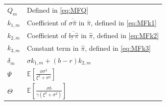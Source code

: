 \documentclass[11pt]{article}
\newenvironment{bluepar}
{\begingroup\color{blue}}
{\endgroup}
\numberwithin{equation}{section}
\begin{document}
\begin{bluepar}
\begin{table}[htbp]
\begin{tabular}{l l}
		$Q_{\scriptscriptstyle m}$ & Defined in \eqref{eq:MFQ} \\
		$k_{1,\scriptscriptstyle m}$ & Coefficient of $\overline{\sigma\widehat{\pi}}$ in $\widehat{\pi}$, defined in \eqref{eq:MFk1} \\
		$k_{2,\scriptscriptstyle m}$ & Coefficient of $\overline{\underline{br}\widehat{\pi}}$ in $\widehat{\pi}$, defined in \eqref{eq:MFk2} \\
		$k_{3,\scriptscriptstyle m}$ & Constant term in $\widehat{\pi}$, defined in \eqref{eq:MFk3} \\
		$\delta_{\scriptscriptstyle m}$ & $\sigma k_{1,\scriptscriptstyle m}+(b-r)k_{2,\scriptscriptstyle m}$ \\
		$\Psi$ & $\mathbb{E}\left[\frac{\phi\sigma^2}{\xi^2+\sigma^2}\right]$ \\
		$\Theta$ & $\mathbb{E}\left[\frac{\sigma b}{\gamma(\xi^2+\sigma^2)}\right]$ \\
		\bottomrule
	\end{tabular}
\end{table}


\end{bluepar}
\end{document}
